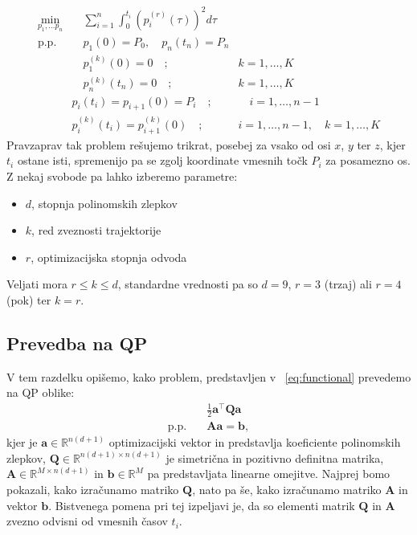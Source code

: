 \documentclass[mat2, tisk]{fmfdelo}
\begin{document}
\begin{equation}
\label{eq:functional}
\begin{aligned}
    \min_{p_1, \ldots p_n}& \quad \sum_{i=1}^n \int_0^{t_i} (p_i^{(r)}(\tau))^2 d\tau \\
    \text{p.p.} & \quad p_1(0) = P_0, \quad p_n(t_n) = P_n& \\
    & \quad p^{(k)}_1(0) = 0 \quad ; \quad &k = 1, \ldots, K \\
     &\quad p^{(k)}_n(t_n) = 0 \quad ; \quad &k = 1, \ldots, K \\
     \quad &p_i(t_i) = p_{i+1}(0) = P_i \quad ;& \quad i = 1, \ldots , n-1 \\
     \quad &p_i^{(k)}(t_i) = p_{i+1}^{(k)}(0) \quad ; \quad &i = 1, \ldots, n-1,\quad k = 1, \ldots, K 
\end{aligned}
\end{equation}
Pravzaprav tak problem rešujemo trikrat, posebej za vsako od osi $x$, $y$ ter $z$, kjer $t_i$ ostane isti, spremenijo pa se zgolj koordinate vmesnih točk $P_i$ za posamezno os. Z nekaj svobode pa lahko izberemo parametre:
\begin{itemize}
    \item $d$, stopnja polinomskih zlepkov
    \item $k$, red zveznosti trajektorije
    \item $r$, optimizacijska stopnja odvoda
\end{itemize}
Veljati mora $r \leq k \leq d$, standardne vrednosti pa so $d = 9$, $r = 3$ (trzaj) ali $r = 4$ (pok) ter $k = r$.

\subsection{Prevedba na QP}
V tem razdelku opišemo, kako problem, predstavljen v ~\eqref{eq:functional} prevedemo na QP oblike:
\begin{equation}
    \begin{aligned}
        &\frac{1}{2}\mathbf{a}^\top \mathbf{Q} \mathbf{a}\\
        \text{p.p.}\quad & \mathbf{A}\mathbf{a} = \mathbf{b},
    \end{aligned}
\end{equation}
kjer je $\mathbf{a} \in \mathbb{R}^{n (d+1)}$ optimizacijski vektor in predstavlja koeficiente polinomskih zlepkov, $\mathbf{Q} \in \mathbb{R}^{n(d+1) \times n(d+1)}$ je simetrična in pozitivno definitna matrika, $\mathbf{A} \in \mathbb{R}^{M \times n(d+1)}$ in $\mathbf{b} \in \mathbb{R}^M$ pa predstavljata linearne omejitve. Najprej bomo pokazali, kako izračunamo matriko $\mathbf{Q}$, nato pa še, kako izračunamo matriko $\mathbf{A}$ in vektor $\mathbf{b}$. Bistvenega pomena pri tej izpeljavi je, da so elementi matrik $\mathbf{Q}$ in $\mathbf{A}$ zvezno odvisni od vmesnih časov $t_i$.
\end{document}
